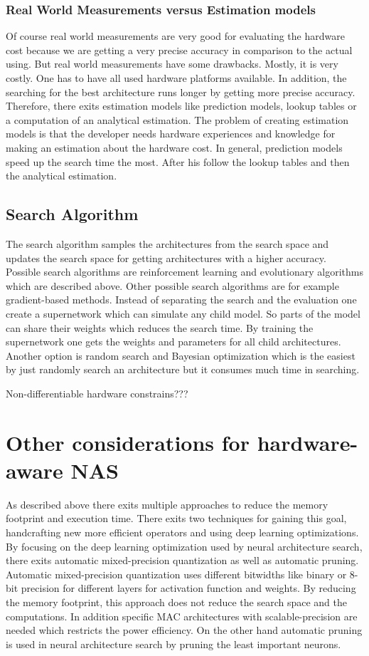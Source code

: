 \documentclass[conference]{IEEEtran}
\begin{document}
\subsubsection{Real World Measurements versus Estimation models}

Of course real world measurements are very good for evaluating the hardware cost because we are getting a very precise accuracy in comparison to the actual using. But real world measurements have some drawbacks. Mostly, it is very costly. One has to have all used hardware platforms available. In addition, the searching for the best architecture runs longer by getting more precise accuracy. Therefore, there exits estimation models like prediction models, lookup tables or a computation of an analytical estimation. The problem of creating estimation models is that the developer needs hardware experiences and knowledge for making an estimation about the hardware cost. In general, prediction models speed up the search time the most. After his follow the lookup tables and then the analytical estimation. 

\subsection{Search Algorithm}
The search algorithm samples the architectures from the search space and updates the search space for getting architectures with a higher accuracy. Possible search algorithms are reinforcement learning and evolutionary algorithms which are described above. Other possible search algorithms are for example gradient-based methods. Instead of separating the search and the evaluation one create a supernetwork which can simulate any child model. So parts of the model can share their weights which reduces the search time. By training the supernetwork one gets the weights and parameters for all child architectures. Another option is random search and Bayesian optimization which is the easiest by just randomly search an architecture but it consumes much time in searching. 

Non-differentiable hardware constrains???

\section{Other considerations for hardware-aware NAS}

As described above there exits multiple approaches to reduce the memory footprint and execution time. There exits two techniques for gaining this goal, handcrafting new more efficient operators and using deep learning optimizations. By focusing on the deep learning optimization used by neural architecture search, there exits automatic mixed-precision quantization as well as automatic pruning. Automatic mixed-precision quantization uses different bitwidths like binary or 8-bit precision for different layers for activation function and weights. By reducing the memory footprint, this approach does not reduce the search space and the computations. In addition specific MAC architectures with scalable-precision are needed which restricts the power efficiency. On the other hand automatic pruning is used in neural architecture search by pruning the least important neurons. 
\end{document}
